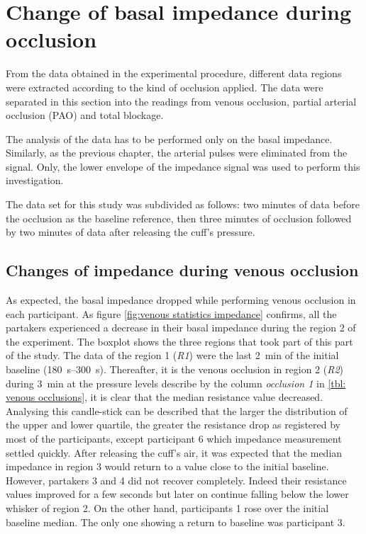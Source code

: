 \section{Change of basal impedance during occlusion}
\label{section occlusion 1}
From the data obtained in the experimental procedure, different data regions were extracted according to the kind of occlusion applied. The data were separated in this section into the readings from venous occlusion, partial arterial occlusion (PAO) and total blockage. 

The analysis of the data has to be performed only on the basal impedance. Similarly, as the previous chapter, the arterial pulses were eliminated from the signal. Only, the lower envelope of the impedance signal was used to perform this investigation. 

The data set for this study was subdivided as follows: two minutes of data before the occlusion as the baseline reference, then three minutes of occlusion followed by two minutes of data after releasing the cuff's pressure. 

\subsection{Changes of impedance during venous occlusion}
\label{section occlusion 1.1}
As expected, the basal impedance dropped while performing venous occlusion in each participant. As figure \ref{fig:venous statistics impedance} confirms, all the partakers experienced a decrease in their basal impedance during the region 2 of the experiment. The boxplot shows the three regions that took part of this part of the study. The data of the region 1 (\textit{R1}) were the last \SI{2}{\minute} of the initial baseline (\SIrange{180}{300}{\second}). Thereafter, it is the venous occlusion in region 2 (\textit{R2}) during \SI{3}{\minute} at the pressure levels describe by the column \textit{occlusion 1} in \ref{tbl: venous occlusions}, it is clear that the median resistance value decreased. Analysing this candle-stick can be described that the larger the distribution of the upper and lower quartile, the greater the resistance drop as registered by most of the participants, except participant 6 which impedance measurement settled quickly. After releasing the cuff's air, it was expected that the median impedance in region 3 would return to a value close to the initial baseline. However, partakers 3 and 4 did not recover completely. Indeed their resistance values improved for a few seconds but later on continue falling below the lower whisker of region 2. On the other hand, participants 1 rose over the initial baseline median. The only one showing a return to baseline was participant 3. 

